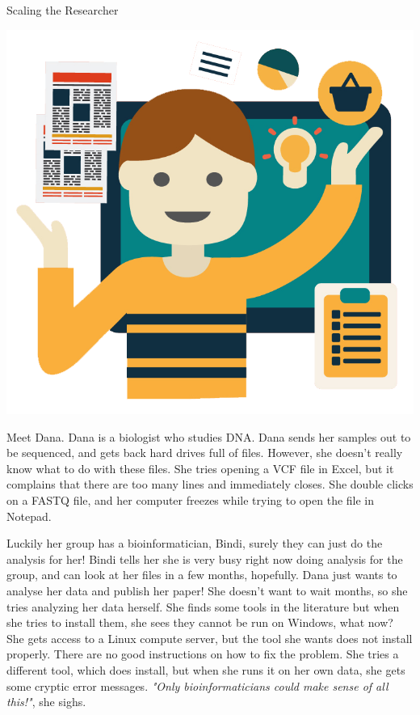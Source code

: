 \begin{center}
\vspace*{-0.5cm}
{\Large Scaling the Researcher \normalsize
\small

\vspace*{0.3cm}
\includegraphics[scale=0.1]{chapters/images/discussion/dana.png}
\vspace*{0.3cm}

Meet Dana.
Dana is a biologist who studies DNA\@.
Dana sends her samples out to be sequenced, and gets back hard drives full of files.
However, she doesn't really know what to do with these files.
She tries opening a VCF file in Excel, but it complains that there are too many lines and immediately closes.
She double clicks on a FASTQ file, and her computer freezes while trying to open the file in Notepad.

Luckily her group has a bioinformatician, Bindi, surely they can just do the analysis for her!
Bindi tells her she is very busy right now doing analysis for the group, and can look at her files in a few months, hopefully.
Dana just wants to analyse her data and publish her paper! She doesn't want to wait months, so she tries analyzing her data herself.
She finds some tools in the literature but when she tries to install them, she sees they cannot be run on Windows, what now?
She gets access to a Linux compute server, but the tool she wants does not install properly.
There are no good instructions on how to fix the problem.
She tries a different tool, which does install, but when she runs it on her own data, she gets some cryptic error messages.
\emph{"Only bioinformaticians could make sense of all this!"}, she sighs.

}
\end{center}
